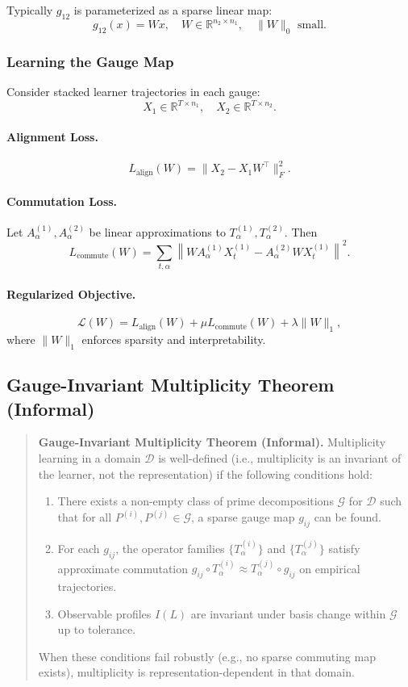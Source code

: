\documentclass[11pt]{article}
\begin{document}
Typically $g_{12}$ is parameterized as a sparse linear map:
\[
g_{12}(x) = W x,\quad W \in \mathbb{R}^{n_2 \times n_1},\quad \|W\|_0 \text{ small}.
\]

\subsubsection{Learning the Gauge Map}

Consider stacked learner trajectories in each gauge:
\[
X_1 \in \mathbb{R}^{T \times n_1}, \quad X_2 \in \mathbb{R}^{T \times n_2}.
\]

\paragraph{Alignment Loss.}
\[
L_{\text{align}}(W) = \|X_2 - X_1 W^\top\|_F^2.
\]

\paragraph{Commutation Loss.}
Let $A^{(1)}_\alpha, A^{(2)}_\alpha$ be linear approximations to $T^{(1)}_\alpha, T^{(2)}_\alpha$. Then
\[
L_{\text{commute}}(W) = \sum_{t,\alpha} \left\| W A^{(1)}_\alpha X^{(1)}_t - A^{(2)}_\alpha W X^{(1)}_t \right\|^2.
\]

\paragraph{Regularized Objective.}
\[
\mathcal{L}(W) = L_{\text{align}}(W) + \mu L_{\text{commute}}(W) + \lambda \|W\|_1,
\]
where $\|W\|_1$ enforces sparsity and interpretability.

\subsection{Gauge-Invariant Multiplicity Theorem (Informal)}

\begin{quote}
\textbf{Gauge-Invariant Multiplicity Theorem (Informal).}
Multiplicity learning in a domain $\mathcal{D}$ is well-defined (i.e., multiplicity is an invariant of the learner, not the representation) if the following conditions hold:
\begin{enumerate}[itemsep=3pt]
  \item There exists a non-empty class of prime decompositions $\mathcal{G}$ for $\mathcal{D}$ such that for all $P^{(i)}, P^{(j)} \in \mathcal{G}$, a sparse gauge map $g_{ij}$ can be found.
  \item For each $g_{ij}$, the operator families $\{T^{(i)}_\alpha\}$ and $\{T^{(j)}_\alpha\}$ satisfy approximate commutation $g_{ij} \circ T^{(i)}_\alpha \approx T^{(j)}_\alpha \circ g_{ij}$ on empirical trajectories.
  \item Observable profiles $I(L)$ are invariant under basis change within $\mathcal{G}$ up to tolerance.
\end{enumerate}
When these conditions fail robustly (e.g., no sparse commuting map exists), multiplicity is representation-dependent in that domain.
\end{quote}
\end{document}

